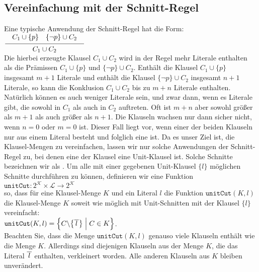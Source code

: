 \subsection{Vereinfachung mit der Schnitt-Regel}
Eine typische Anwendung der Schnitt-Regel hat die Form: \\[0.2cm]
\hspace*{1.3cm} $\schluss{ C_1 \cup \{p\} \quad \{\neg p\} \cup C_2}{C_1 \cup C_2}$
\\[0.2cm]
Die hierbei erzeugte Klausel $C_1 \cup C_2$ wird in der Regel mehr Literale enthalten
als die Prämissen $C_1 \cup \{p\}$ und $\bigl\{\neg p\} \cup C_2$.  Enthält die
Klausel $C_1 \cup \{p\}$ insgesamt $m+1$ Literale und enthält die Klausel
$\bigl\{\neg p\} \cup C_2$ insgesamt $n+1$ Literale, so kann die Konklusion $C_1 \cup C_2$ 
bis zu $m + n$ Literale enthalten.  Natürlich können es auch weniger Literale 
sein, und zwar dann, wenn es Literale gibt, die sowohl in $C_1$ als auch in $C_2$
auftreten.  Oft ist $m + n$ aber sowohl größer als $m + 1$ als auch größer als $n + 1$.  Die
Klauseln wachsen nur dann sicher nicht, wenn  $n = 0$ oder $m = 0$ ist.
Dieser Fall liegt vor, wenn einer der beiden Klauseln nur aus einem Literal besteht
und folglich eine  ist.  Da es unser Ziel ist, die Klausel-Mengen
zu vereinfachen, lassen wir nur solche Anwendungen der Schnitt-Regel zu, bei denen
eine der Klausel eine Unit-Klausel ist.  Solche Schnitte bezeichnen wir als
.  Um alle mit einer gegebenen Unit-Klausel $\{l\}$ möglichen Schnitte
durchführen zu können, definieren wir eine Funktion
\\[0.2cm]
\hspace*{1.3cm}
$\texttt{unitCut}: 2^\mathcal{K} \times \mathcal{L} \rightarrow 2^\mathcal{K}$
\\[0.2cm]
so, dass für eine Klausel-Menge $K$ und ein Literal $l$ die Funktion
$\texttt{unitCut}(K,l)$ die Klausel-Menge $K$ soweit wie möglich mit Unit-Schnitten mit der Klausel
$\{l\}$ vereinfacht:
\\[0.2cm]
\hspace*{1.3cm}
$\texttt{unitCut}(K,l) = \Bigl\{ C \backslash \bigl\{ \overline{\,l\,} \bigr\} \;\Big|\; C \in K \Bigr\}$.
\\[0.2cm]
Beachten Sie, dass die Menge $\texttt{unitCut}(K,l)$ genauso viele Klauseln enthält wie die Menge
$K$.  Allerdings sind diejenigen Klauseln aus der Menge $K$, die das Literal $\overline{\,l\,}$
enthalten, verkleinert worden.   Alle anderen Klauseln aus $K$ bleiben unverändert.

